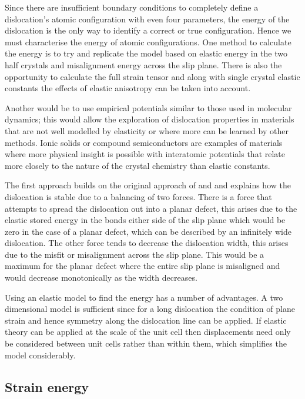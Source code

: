 

Since there are insufficient boundary conditions to completely define a dislocation's atomic configuration with even four parameters, the energy of the dislocation is the only way to identify a correct or true configuration. Hence we must characterise the energy of atomic configurations. One method to calculate the energy is to try and replicate the model based on elastic energy in the two half crystals and misalignment energy across the slip plane. There is also the opportunity to calculate the full strain tensor and along with single crystal elastic constants the effects of elastic anisotropy can be taken into account. 

Another would be to use empirical potentials similar to those used in molecular dynamics; this would allow the exploration of dislocation properties in materials that are not well modelled by elasticity or where more can be learned by other methods. Ionic solids or compound semiconductors are examples of materials where more physical insight is possible with interatomic potentials that relate more closely to the nature of the crystal chemistry than elastic constants. 



The first approach builds on the original approach of \citet{Peierls1940} and \citet{Nabarro1947} and explains how the dislocation is stable due to a balancing of two forces. There is a force that attempts to spread the dislocation out into a planar defect, this arises due to the elastic stored energy in the bonds either side of the slip plane which would be zero in the case of a planar defect, which can be described by an infinitely wide dislocation. The other force tends to decrease the dislocation width, this arises due to the misfit or misalignment across the slip plane. This would be a maximum for the planar defect where the entire slip plane is misaligned and would decrease monotonically as the width decreases.

Using an elastic model to find the energy has a number of advantages. A two dimensional model is sufficient since for a long dislocation the condition of plane strain and hence symmetry along the dislocation line can be applied. If elastic theory can be applied at the scale of the unit cell then displacements need only be considered between unit cells rather than within them, which simplifies the model considerably.

\subsection{Strain energy}

